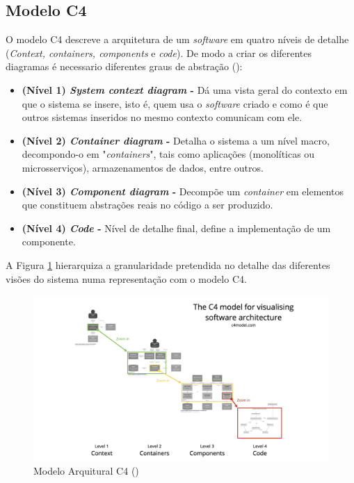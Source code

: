 \subsection{Modelo C4}
\label{subsec:modelC4}

O modelo C4 descreve a arquitetura de um \textit{software} em quatro níveis de detalhe (\textit{Context, containers, components} e \textit{code}). De modo a criar os diferentes diagramas é necessario diferentes graus de abstração (\cite{Brown2018}):

\begin{itemize}
    \item \textbf{(Nível 1) \textit{System context diagram} -} Dá uma vista geral do contexto em que o sistema se insere, isto é, quem usa o \textit{software} criado e como é que outros sistemas inseridos no mesmo contexto comunicam com ele. 
    \item \textbf{(Nível 2) \textit{Container diagram} -} Detalha o sistema a um nível macro, decompondo-o em "\textit{containers}", tais como aplicações (monolíticas ou microsserviços), armazenamentos de dados, entre outros.
    \item \textbf{(Nível 3) \textit{Component diagram} -} Decompõe um \textit{container} em elementos que constituem abstrações reais no código a ser produzido.
    \item \textbf{(Nível 4) \textit{Code} -} Nível de detalhe final, define a implementação de um componente.
\end{itemize}

A Figura \ref{fig:c4model} hierarquiza a granularidade pretendida no detalhe das diferentes visões do sistema numa representação com o modelo C4.

\begin{figure}[H]
    \centering
    \includegraphics[width=\linewidth,keepaspectratio]{frontmatter/assets/models/c4-overview.png}
    \caption{Modelo Arquitural C4 (\cite{C4Model})}
    \label{fig:c4model}
\end{figure}

